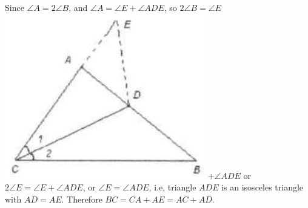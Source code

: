 \documentclass{article}
\begin{document}
Since \(\angle A=2 \angle B\), and \(\angle A=\angle E+\angle A D E\), so \(2 \angle B=\angle E\)\\
\includegraphics[width=\textwidth]{images/057.jpg} \(+\angle A D E\) or \(2 \angle E=\angle E+\angle A D E\), or \(\angle E=\angle A D E\), i.e, triangle \(A D E\) is an isosceles triangle with \(A D=A E\). Therefore \(B C=C A+A E=A C+A D\).
\end{document}
